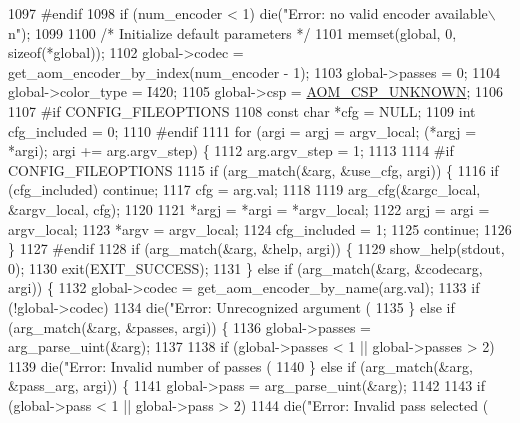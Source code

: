 \begin{DoxyCodeInclude}
{{{{{{{{{{{1097 \textcolor{preprocessor}{#endif}
1098   \textcolor{keywordflow}{if} (num\_encoder < 1) die(\textcolor{stringliteral}{"Error: no valid encoder available\(\backslash\)n"});
1099 
1100   \textcolor{comment}{/* Initialize default parameters */}
1101   memset(global, 0, \textcolor{keyword}{sizeof}(*global));
1102   global->codec = get\_aom\_encoder\_by\_index(num\_encoder - 1);
1103   global->passes = 0;
1104   global->color\_type = I420;
1105   global->csp = \hyperlink{aom__image_8h_a10590253ef3dbde7e93ed5d4b4e0e73ba7843506f3e28f720be0d4f03237fb48c}{AOM\_CSP\_UNKNOWN};
1106 
1107 \textcolor{preprocessor}{#if CONFIG\_FILEOPTIONS}
1108   \textcolor{keyword}{const} \textcolor{keywordtype}{char} *cfg = NULL;
1109   \textcolor{keywordtype}{int} cfg\_included = 0;
1110 \textcolor{preprocessor}{#endif}
1111   \textcolor{keywordflow}{for} (argi = argj = argv\_local; (*argj = *argi); argi += arg.argv\_step) \{
1112     arg.argv\_step = 1;
1113 
1114 \textcolor{preprocessor}{#if CONFIG\_FILEOPTIONS}
1115     \textcolor{keywordflow}{if} (arg\_match(&arg, &use\_cfg, argi)) \{
1116       \textcolor{keywordflow}{if} (cfg\_included) \textcolor{keywordflow}{continue};
1117       cfg = arg.val;
1118 
1119       arg\_cfg(&argc\_local, &argv\_local, cfg);
1120 
1121       *argj = *argi = *argv\_local;
1122       argj = argi = argv\_local;
1123       *argv = argv\_local;
1124       cfg\_included = 1;
1125       \textcolor{keywordflow}{continue};
1126     \}
1127 \textcolor{preprocessor}{#endif}
1128     \textcolor{keywordflow}{if} (arg\_match(&arg, &help, argi)) \{
1129       show\_help(stdout, 0);
1130       exit(EXIT\_SUCCESS);
1131     \} \textcolor{keywordflow}{else} \textcolor{keywordflow}{if} (arg\_match(&arg, &codecarg, argi)) \{
1132       global->codec = get\_aom\_encoder\_by\_name(arg.val);
1133       \textcolor{keywordflow}{if} (!global->codec)
1134         die(\textcolor{stringliteral}{"Error: Unrecognized argument (%
1135     \} \textcolor{keywordflow}{else} \textcolor{keywordflow}{if} (arg\_match(&arg, &passes, argi)) \{
1136       global->passes = arg\_parse\_uint(&arg);
1137 
1138       \textcolor{keywordflow}{if} (global->passes < 1 || global->passes > 2)
1139         die(\textcolor{stringliteral}{"Error: Invalid number of passes (%
1140     \} \textcolor{keywordflow}{else} \textcolor{keywordflow}{if} (arg\_match(&arg, &pass\_arg, argi)) \{
1141       global->pass = arg\_parse\_uint(&arg);
1142 
1143       \textcolor{keywordflow}{if} (global->pass < 1 || global->pass > 2)
1144         die(\textcolor{stringliteral}{"Error: Invalid pass selected (%
}}}}}}}}}}}}}}
\end{DoxyCodeInclude}
